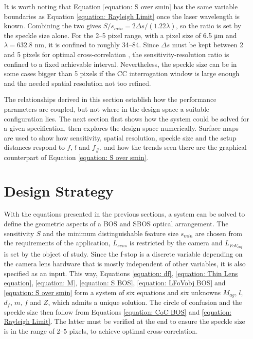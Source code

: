 \par It is worth noting that Equation \ref{equation: S over smin} has the same variable boundaries as Equation \ref{equation: Rayleigh Limit} once the laser wavelength is known. Combining the two gives $S/s_{min} = 2\Delta s/(1.22\lambda)$, so the ratio is set by the speckle size alone. For the 2--5 pixel range, with a pixel size of 6.5 \si{\micro\metre} and $\lambda = 632.8$ nm, it is confined to roughly 34--84. Since $\Delta s$ must be kept between 2 and 5 pixels for optimal cross-correlation \cite{KahlerEtAl}, the sensitivity-resolution ratio is confined to a fixed achievable interval. Nevertheless, the speckle size can be in some cases bigger than 5 pixels if the CC interrogation window is large enough and the needed spatial resolution not too refined.

\par The relationships derived in this section establish how the performance parameters are coupled, but not where in the design space a suitable configuration lies. The next section first shows how the system could be solved for a given specification, then explores the design space numerically. Surface maps are used to show how sensitivity, spatial resolution, speckle size and the setup distances respond to $f$, $l$ and $f_\#$, and how the trends seen there are the graphical counterpart of Equation \ref{equation: S over smin}.

\section{Design Strategy}
\label{section: Design Strategy}
\par With the equations presented in the previous sections, a system can be solved to define the geometric aspects of a BOS and SBOS optical arrangement. The sensitivity $S$ and the minimum distinguishable feature size $s_{min}$ are chosen from the requirements of the application, $L_{sens}$ is restricted by the camera and $L_{FoV_{obj}}$ is set by the object of study. Since the f-stop is a discrete variable depending on the camera lens hardware that is mostly independent of other variables, it is also specified as an input. This way, Equations \ref{equation: df},
\ref{equation: Thin Lens equation}, \ref{equation: M}, \ref{equation: S BOS}, \ref{equation: LFoVobj BOS} and \ref{equation: S over smin} form a system of six equations and six unknowns $M_{ag}$, $l$, $d_f$, $m$, $f$ and $Z$, which admits a unique solution. The circle of confusion and the speckle size then
follow from Equations \ref{equation: CoC BOS} and \ref{equation: Rayleigh Limit}. The latter must be verified at the end to ensure the speckle size is in the range of 2--5 pixels, to achieve optimal cross-correlation. 

